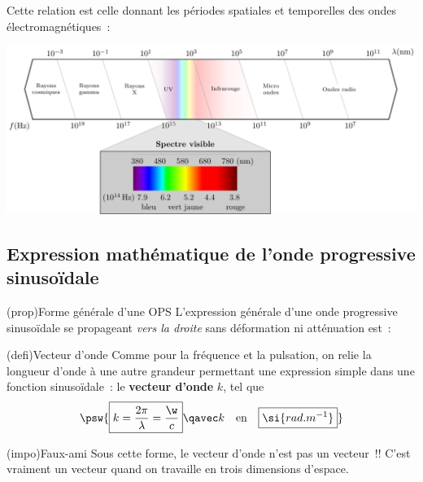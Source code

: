 \documentclass[../../main/main.tex]{subfiles}
\begin{document}
Cette relation est celle donnant les périodes spatiales et temporelles des ondes
électromagnétiques~:
\vspace{-25pt}
\begin{center}
	\includegraphics[width=.95\linewidth]{full_spectre}
\end{center}

\subsection{Expression mathématique de l'onde progressive sinusoïdale}

\begin{tcb*}(prop){Forme générale d'une OPS}
	L'expression générale d'une onde progressive sinusoïdale se propageant
	\textit{vers la droite} sans déformation ni atténuation est~:
	\vspace{-10pt}
\end{tcb*}

\begin{tcb*}(defi){Vecteur d'onde}
	Comme pour la fréquence et la pulsation, on relie la longueur d'onde à une
	autre grandeur permettant une expression simple dans une fonction
	sinusoïdale~: le \textbf{vecteur d'onde} $k$, tel que
	\[
		\psw{\boxed{k = \frac{2\pi}{\lambda} = \frac{\w}{c}}
			\qavec
			k\quad\text{en}\quad\boxed{\si{rad.m^{-1}}}}
	\]
\end{tcb*}

\begin{tcb*}(impo){Faux-ami}
	Sous cette forme, le vecteur d'onde n'est pas un vecteur~!! C'est vraiment un
	vecteur quand on travaille en trois dimensions d'espace.
\end{tcb*}
\end{document}

